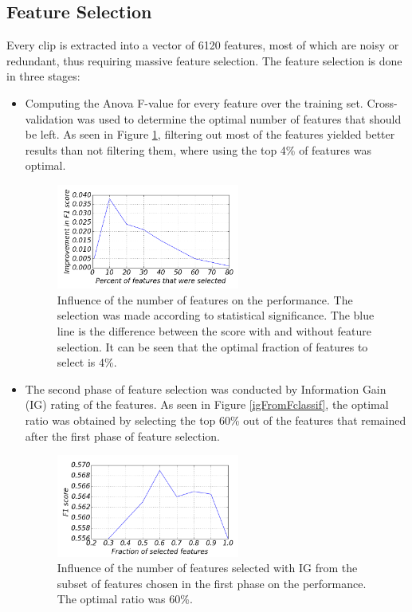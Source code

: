 \documentclass[journal]{journal}
\begin{document}
\subsection{Feature Selection}
Every clip is extracted into a vector of 6120 features, most of which are noisy or redundant, thus requiring massive feature selection. The feature selection is done in three stages:
	\begin{itemize}
		\item
		Computing the Anova F-value for every feature over the training set. Cross-validation was used to determine the optimal number of features that should be
		left. As seen in Figure  \ref{selection}, filtering out most of the features yielded better          results than not filtering them, where using the top 4\% of features was optimal.
		\begin{figure}[ht!]
			\centering
			\includegraphics[width=60mm]{featureSelection.png}
			\caption{Influence of the number of features on the performance. The
			selection was made according to statistical significance.
			The blue line is the difference between the score with and without feature
			selection. It can be seen that the optimal fraction of features to select is
			4\%.}
			\label{selection}
			\end{figure}
		\item
			The second phase of feature selection was conducted by Information Gain (IG) rating of the features. As seen in Figure  \ref{igFromFclassif}, the optimal ratio was obtained by selecting the top 60\% out of the features that remained after the first
			phase of feature selection.
			 \begin{figure}[h]
				\centering
				\caption{Influence of the number of features selected with IG from the subset
				of features chosen in the first phase on the performance. The
				optimal ratio was 60\%.}
				\includegraphics[width=60mm]{igFromFclassif.png}

\end{figure}
\end{itemize}
\end{document}
